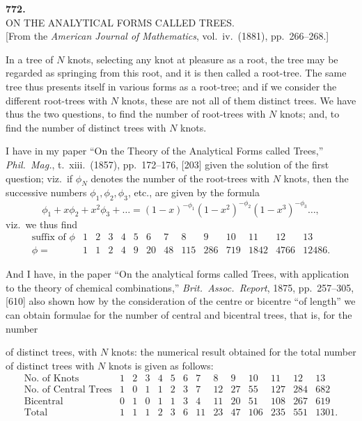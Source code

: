 \documentclass[11pt,a4paper]{article}
\begin{document}
\newpage
\begin{center}
\textbf{772.}\\[4pt]
\textsc{ON THE ANALYTICAL FORMS CALLED TREES.}\\[4pt]
[From the \textit{American Journal of Mathematics}, vol.\ iv.\ (1881), pp.\ 266--268.]
\end{center}

\bigskip

\noindent
In a tree of $N$ knots, selecting any knot at pleasure as a root, the
tree may be regarded as springing from this root, and it is then called
a root-tree. The same tree thus presents itself in various forms as a
root-tree; and if we consider the different root-trees with $N$ knots,
these are not all of them distinct trees. We have thus the two
questions, to find the number of root-trees with $N$ knots; and, to find
the number of distinct trees with $N$ knots.

I have in my paper ``On the Theory of the Analytical Forms called
Trees,'' \textit{Phil.\ Mag.}, t.~xiii.\ (1857), pp.\ 172--176, [203]
given the solution of the first question; viz.\ if $\phi_{N}$ denotes
the number of the root-trees with $N$ knots, then the successive
numbers $\phi_{1},\phi_{2},\phi_{3}$, etc., are given by the formula
\[
  \phi_{1}+x\phi_{2}+x^{2}\phi_{3}+\ldots = (1-x)^{-\phi_{1}}(1-x^{2})^{-\phi_{2}}(1-x^{3})^{-\phi_{3}}\ldots,
\]
viz.\ we thus find
\[
  \begin{array}{c|ccccccccccccc}
    \text{suffix of }\phi & 1 & 2 & 3 & 4 & 5 & 6 & 7 & 8 & 9 & 10 & 11 & 12 & 13 \\
    \hline
    \phi=                 & 1 & 1 & 2 & 4 & 9 & 20 & 48 & 115 & 286 & 719 & 1842 & 4766 & 12486.
  \end{array}
\]

And I have, in the paper ``On the analytical forms called Trees, with
application to the theory of chemical combinations,'' \textit{Brit.\
Assoc.\ Report}, 1875, pp.\ 257--305, [610] also shown how by the
consideration of the centre or bicentre ``of length'' we can obtain
formulae for the number of central and bicentral trees, that is, for
the number

\newpage
\noindent
of distinct trees, with $N$ knots: the numerical result obtained for
the total number of distinct trees with $N$ knots is given as follows:
\[
  \begin{array}{l|ccccccccccccc}
    \text{No.\ of Knots}    & 1 & 2 & 3 & 4 & 5 & 6 & 7  & 8  & 9  & 10  & 11  & 12  & 13 \\
    \hline
    \text{No.\ of Central Trees} & 1 & 0 & 1 & 1 & 2 & 3 & 7  & 12 & 27 & 55  & 127 & 284 & 682 \\
    \text{Bicentral}             & 0 & 1 & 0 & 1 & 1 & 3 & 4  & 11 & 20 & 51  & 108 & 267 & 619 \\
    \text{Total}                 & 1 & 1 & 1 & 2 & 3 & 6 & 11 & 23 & 47 & 106 & 235 & 551 & 1301.
  \end{array}
\]
\end{document}
